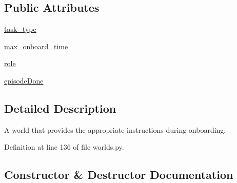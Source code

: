 \subsection*{Public Attributes}
\begin{DoxyCompactItemize}
\item 
\hyperlink{classparlai_1_1mturk_1_1tasks_1_1wizard__of__wikipedia_1_1worlds_1_1RoleOnboardWorld_a9a12f1f9c3e0648d520b5a60103026e2}{task\+\_\+type}
\item 
\hyperlink{classparlai_1_1mturk_1_1tasks_1_1wizard__of__wikipedia_1_1worlds_1_1RoleOnboardWorld_a52544620386fc0dee8de4c1e28223281}{max\+\_\+onboard\+\_\+time}
\item 
\hyperlink{classparlai_1_1mturk_1_1tasks_1_1wizard__of__wikipedia_1_1worlds_1_1RoleOnboardWorld_a23e9dabe75318cc16b819f1868026a71}{role}
\item 
\hyperlink{classparlai_1_1mturk_1_1tasks_1_1wizard__of__wikipedia_1_1worlds_1_1RoleOnboardWorld_a37cf10b9e972e9de5dae2191cbe46c2b}{episode\+Done}
\end{DoxyCompactItemize}


\subsection{Detailed Description}
\begin{DoxyVerb}A world that provides the appropriate instructions during onboarding.
\end{DoxyVerb}
 

Definition at line 136 of file worlds.\+py.



\subsection{Constructor \& Destructor Documentation}
\mbox{\label{classparlai_1_1mturk_1_1tasks_1_1wizard__of__wikipedia_1_1worlds_1_1RoleOnboardWorld_acd0e219bbdd512e859e259bbb8c8cb6a}} 
